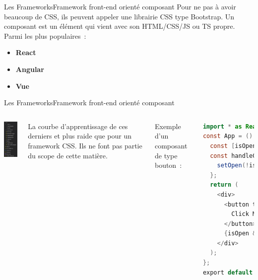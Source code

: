 \documentclass{beamer}
\begin{document}
    \begin{frame}{Les Frameworks}{Framework front-end orienté composant}
        Pour ne pas à avoir beaucoup de CSS, ils peuvent appeler une librairie CSS type Bootstrap.
        \bigbreak
        Un composant est un élément qui vient avec son HTML/CSS/JS ou TS propre.
        \bigbreak
        Parmi les plus populaires~:
        \begin{itemize}
            \item \textbf{React}
            \item \textbf{Angular}
            \item \textbf{Vue}
        \end{itemize}
    \end{frame}

    \begin{frame}[fragile]{Les Frameworks}{Framework front-end orienté composant}

        \begin{columns}
            \centering
            \includegraphics[width=2.5cm]{image/react-beginner-project-structure}
            \begin{dangercolorbox}
                La courbe d'apprentissage de ces derniers et plus raide que pour un framework CSS.
                Ils ne font pas partie du scope de cette matière.
            \end{dangercolorbox}
            Exemple d'un composant de type bouton~:
            \begin{lstlisting}[language=Java,basicstyle=\tiny\ttfamily]
import * as React from 'react';
const App = () => {
  const [isOpen, setOpen] = React.useState(false);
  const handleClick = () => {
    setOpen(!isOpen);
  };
  return (
    <div>
      <button type="button" onClick={handleClick}>
        Click Me
      </button>
      {isOpen && <div>Content</div>}
    </div>
  );
};
export default App;
            \end{lstlisting}
        \end{columns}
    \end{frame}
\end{document}
